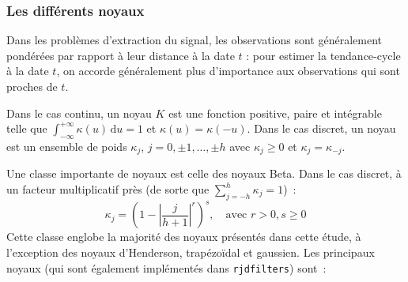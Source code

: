 \documentclass[
  12pt,
  french,
  12pt,a4paper]{article}
\newcommand\1{\mathds{1}}
\newcommand\ud{\,\mathrm{d}}
\begin{document}
\hypertarget{sec-kernels}{%
\subsubsection{Les différents noyaux}\label{sec-kernels}}

Dans les problèmes d'extraction du signal, les observations sont généralement pondérées par rapport à leur distance à la date \(t\) : pour estimer la tendance-cycle à la date \(t\), on accorde généralement plus d'importance aux observations qui sont proches de \(t\).

Dans le cas continu, un noyau \(K\) est une fonction positive, paire et intégrable telle que \(\int_{-\infty}^{+\infty}\kappa(u) \ud u=1\) et \(\kappa(u)=\kappa(-u)\).
Dans le cas discret, un noyau est un ensemble de poids \(\kappa_j\), \(j=0,\pm1,\dots,\pm h\) avec \(\kappa_j \geq0\) et \(\kappa_j=\kappa_{-j}\).

Une classe importante de noyaux est celle des noyaux Beta.
Dans le cas discret, à un facteur multiplicatif près (de sorte que \(\sum_{j=-h}^h\kappa_j=1\))~:
\[
\kappa_j = \left(
  1-
  \left\lvert
  \frac j {h+1}
  \right\lvert^r
\right)^s,\quad\text{avec }r>0,s\geq 0
\]
Cette classe englobe la majorité des noyaux présentés dans cette étude, à l'exception des noyaux d'Henderson, trapézoïdal et gaussien.
Les principaux noyaux (qui sont également implémentés dans \texttt{rjdfilters}) sont~:
\end{document}
